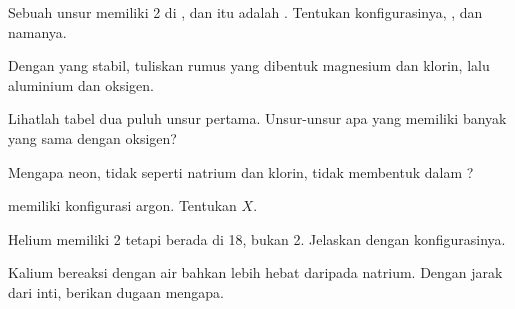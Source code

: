 \begin{exercise}[$\star\star$]\label{exo:g10:electron-shells:7}
Sebuah unsur memiliki 2  di , dan  itu
adalah . Tentukan konfigurasinya, , dan
namanya.
\end{exercise}

\begin{exercise}[$\star\star$]\label{exo:g10:electron-shells:8}
Dengan  yang stabil, tuliskan rumus  yang dibentuk
magnesium dan klorin, lalu aluminium dan oksigen.
\end{exercise}

\begin{exercise}[$\star\star$]\label{exo:g10:electron-shells:9}
Lihatlah tabel dua puluh unsur pertama. Unsur-unsur apa yang memiliki
banyak  yang sama dengan oksigen?
\end{exercise}

\begin{exercise}[$\star\star$]\label{exo:g10:electron-shells:10}
Mengapa neon, tidak seperti natrium dan klorin, tidak membentuk 
dalam ?
\end{exercise}

\begin{exercise}[$\star\star$]\label{exo:g10:electron-shells:11}
  memiliki konfigurasi argon. Tentukan $X$.
\end{exercise}

\begin{exercise}[$\star\star\star$]\label{exo:g10:electron-shells:12}
Helium memiliki 2  tetapi berada di  18, bukan
 2. Jelaskan dengan konfigurasinya.
\end{exercise}

\begin{exercise}[$\star\star\star$]\label{exo:g10:electron-shells:13}
Kalium bereaksi dengan air bahkan lebih hebat daripada natrium. Dengan
jarak  dari inti, berikan dugaan mengapa.
\end{exercise}

